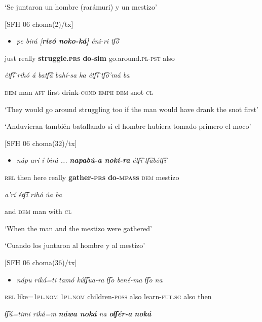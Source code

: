     ‘Se juntaron un hombre (rarámuri) y un mestizo’

 [SFH 06 choma(2)/tx]

\begin{itemize}
\item   \textit{pe   birá   [}\textbf{\textit{risó     noko-ká]} }\textit{éni-ri       tʃ͡ó}   
\end{itemize}

    just  really  \textbf{struggle.\textsc{prs}} \textbf{do-sim} go.around.\textsc{pl-pst}  also  

   \textit{étʃ͡i   rihó   á   batʃ͡á   bahí-sa   ka   étʃ͡i   tʃ͡o’má   ba}

    \textsc{dem}  man  \textsc{aff}  first  drink-\textsc{cond  emph  dem}  snot  \textsc{cl}

    ‘They would go around struggling too if the man would have drank the snot first’

    ‘Anduvieran también batallando si el hombre hubiera tomado primero el moco’

    [SFH 06 choma(32)/tx]

\begin{itemize}
\item    \textit{náp   arí  í   birá ...} \textbf{\textit{napabú-a   nokí-ra}} \textit{étʃ͡i   tʃ͡abótʃ͡i}   
\end{itemize}

    \textsc{rel}  then  here  really  \textbf{gather-\textsc{prs} }\textbf{do-\textsc{mpass}}  \textsc{dem}  mestizo

    \textit{a'rí   étʃ͡i   rihó   úa   ba}

    and   \textsc{dem}  man  with  \textsc{cl}

    ‘When the man and the mestizo were gathered’

    ‘Cuando los juntaron al hombre y al mestizo’    

    [SFH 06 choma(36)/tx]

\begin{itemize}
\item \textit{nápu   riká=ti   tamó     kút͡ʃua-ra   t͡ʃo   bené-ma  t͡ʃo   na}
\end{itemize}

\textsc{rel}  like=1\textsc{pl.nom}  1\textsc{pl.nom}  children-\textsc{poss}  also  learn-\textsc{fut.sg}  also  then  

  \textit{t͡ʃú=timi   riká=m} \textbf{\textit{náwa     noká}} \textit{na} \textbf{\textit{ot͡ʃér-a}} \textbf{\textit{noká}} 

